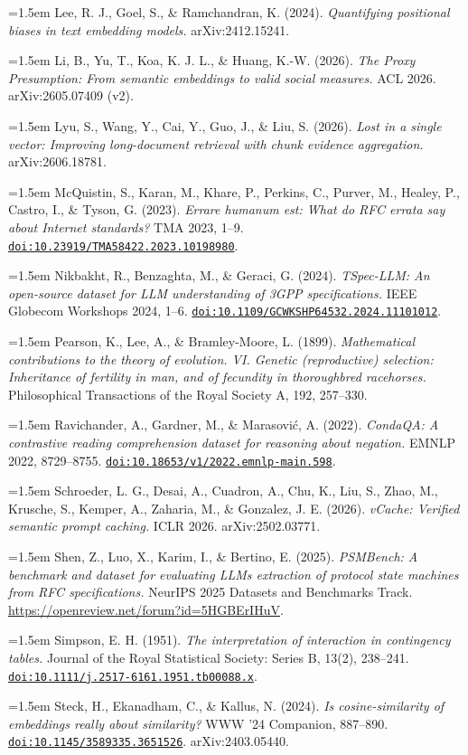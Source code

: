 \documentclass[11pt]{article}
\newcommand{\bibentry}[1]{\par\noindent\hangindent=1.5em\hangafter=1 #1\par\vspace{2pt}}
\newcommand{\doilink}[1]{\href{https://doi.org/#1}{\nolinkurl{doi:#1}}}
\begin{document}
\bibentry{\hypertarget{bib:lee}{}Lee, R. J., Goel, S., \& Ramchandran, K. (2024). \emph{Quantifying positional biases in text embedding models.} arXiv:2412.15241.}
\bibentry{\hypertarget{bib:li}{}Li, B., Yu, T., Koa, K. J. L., \& Huang, K.-W. (2026). \emph{The Proxy Presumption: From semantic embeddings to valid social measures.} ACL 2026. arXiv:2605.07409 (v2).}
\bibentry{\hypertarget{bib:lyu}{}Lyu, S., Wang, Y., Cai, Y., Guo, J., \& Liu, S. (2026). \emph{Lost in a single vector: Improving long-document retrieval with chunk evidence aggregation.} arXiv:2606.18781.}
\bibentry{\hypertarget{bib:mcquistin}{}McQuistin, S., Karan, M., Khare, P., Perkins, C., Purver, M., Healey, P., Castro, I., \& Tyson, G. (2023). \emph{Errare humanum est: What do RFC errata say about Internet standards?} TMA 2023, 1--9. \doilink{10.23919/TMA58422.2023.10198980}.}
\bibentry{\hypertarget{bib:nikbakht}{}Nikbakht, R., Benzaghta, M., \& Geraci, G. (2024). \emph{TSpec-LLM: An open-source dataset for LLM understanding of 3GPP specifications.} IEEE Globecom Workshops 2024, 1--6. \doilink{10.1109/GCWKSHP64532.2024.11101012}.}
\bibentry{\hypertarget{bib:pearson}{}Pearson, K., Lee, A., \& Bramley-Moore, L. (1899). \emph{Mathematical contributions to the theory of evolution. VI. Genetic (reproductive) selection: Inheritance of fertility in man, and of fecundity in thoroughbred racehorses.} Philosophical Transactions of the Royal Society A, 192, 257--330.}
\bibentry{\hypertarget{bib:ravichander}{}Ravichander, A., Gardner, M., \& Marasovi\'c, A. (2022). \emph{CondaQA: A contrastive reading comprehension dataset for reasoning about negation.} EMNLP 2022, 8729--8755. \doilink{10.18653/v1/2022.emnlp-main.598}.}
\bibentry{\hypertarget{bib:schroeder}{}Schroeder, L. G., Desai, A., Cuadron, A., Chu, K., Liu, S., Zhao, M., Krusche, S., Kemper, A., Zaharia, M., \& Gonzalez, J. E. (2026). \emph{vCache: Verified semantic prompt caching.} ICLR 2026. arXiv:2502.03771.}
\bibentry{\hypertarget{bib:shen}{}Shen, Z., Luo, X., Karim, I., \& Bertino, E. (2025). \emph{PSMBench: A benchmark and dataset for evaluating LLMs extraction of protocol state machines from RFC specifications.} NeurIPS 2025 Datasets and Benchmarks Track. \url{https://openreview.net/forum?id=5HGBErIHuV}.}
\bibentry{\hypertarget{bib:simpson}{}Simpson, E. H. (1951). \emph{The interpretation of interaction in contingency tables.} Journal of the Royal Statistical Society: Series B, 13(2), 238--241. \doilink{10.1111/j.2517-6161.1951.tb00088.x}.}
\bibentry{\hypertarget{bib:steck}{}Steck, H., Ekanadham, C., \& Kallus, N. (2024). \emph{Is cosine-similarity of embeddings really about similarity?} WWW '24 Companion, 887--890. \doilink{10.1145/3589335.3651526}. arXiv:2403.05440.}
\end{document}
